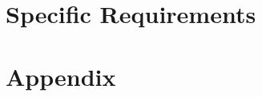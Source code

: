 \maketitle
\clearpage
\tableofcontents

\clearpage


\clearpage


\clearpage
\section{Specific Requirements}




\clearpage\section{Appendix}